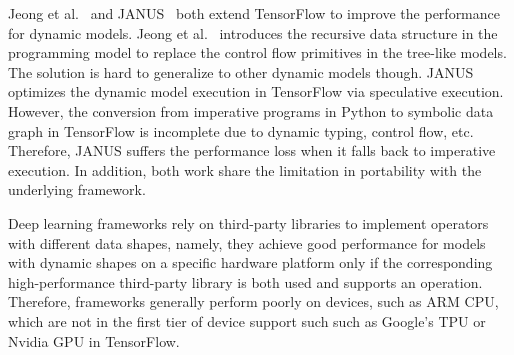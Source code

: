 Jeong et al.~\citep{jeong2018improving} and JANUS~\citep{jeong2019janus} both extend TensorFlow to improve the performance for dynamic models. Jeong et al.~\citep{jeong2018improving} introduces the recursive data structure in the programming model to replace the control flow primitives in the tree-like models. The solution is hard to generalize to other dynamic models though. JANUS~\citep{jeong2019janus} optimizes the dynamic model execution in TensorFlow via speculative execution. However, the conversion from imperative programs in Python to symbolic data graph in TensorFlow is incomplete due to dynamic typing, control flow, etc. Therefore, JANUS suffers the performance loss when it falls back to imperative execution. In addition, both work share the limitation in portability with the underlying framework.


Deep learning frameworks rely on third-party libraries to implement operators with different data shapes, namely, they achieve good performance for models with dynamic shapes on a specific hardware platform only if the corresponding high-performance third-party library is both used and supports an operation. Therefore, frameworks generally perform poorly on devices, such as ARM CPU, which are not in the first tier of device support such such as Google's TPU or Nvidia GPU in TensorFlow.

